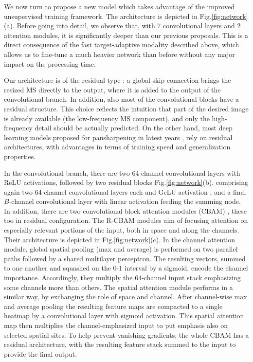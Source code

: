 \documentclass[journal]{IEEEtran}
\begin{document}
We now turn to propose a new model which takes advantage of the improved unsupervised training framework.
The architecture is depicted in Fig.\ref{fig:network}(a).
Before going into detail, we observe that, with 7 convolutional layers and 2 attention modules, it is significantly deeper than our previous proposals.
This is a direct consequence of the fast target-adaptive modality described above,
which allows us to fine-tune a much heavier network than before without any major impact on the processing time.

Our architecture is of the residual type \cite{He2016}:
a global skip connection brings the resized MS directly to the output,
where it is added to the output of the convolutional branch.
In addition, also most of the convolutional blocks have a residual structure.
This choice reflects the intuition that part of the desired image is already available (the low-frequency MS component),
and only the high-frequency detail should be actually predicted.
On the other hand, most deep learning models proposed for pansharpening in latest years \cite{Yang2017, Wei2017L, Yuan2018, Deng2020, Luo2020, Ciotola2022},
rely on residual architectures, with advantages in terms of training speed and generalization properties.

In the convolutional branch, there are two 64-channel convolutional layers with ReLU activations,
followed by two residual blocks Fig.\ref{fig:network}(b),
comprising again two 64-channel convolutional layers each and GeLU activation \cite{Hendrycks2016},
and a final $B$-channel convolutional layer with linear activation feeding the summing node.
In addition, there are two convolutional block attention modules (CBAM) \cite{Woo2018}, these too in residual configuration.
The R-CBAM modules aim of focusing attention on especially relevant portions of the input, both in space and along the channels.
Their architecture is depicted in Fig.\ref{fig:network}(c).
In the channel attention module,
global spatial pooling (max and average) is performed on two parallel paths followed by a shared multilayer perceptron.
The resulting vectors, summed to one another and squashed on the 0-1 interval by a sigmoid,
encode the channel importance.
Accordingly, they multiply the 64-channel input stack emphasizing some channels more than others.
The spatial attention module performs in a similar way, by exchanging the role of space and channel.
After channel-wise max and average pooling
the resulting feature maps are compacted to a single heatmap by a convolutional layer with sigmoid activation.
This spatial attention map then multiplies the channel-emphasized input to put emphasis also on selected spatial sites.
To help prevent vanishing gradients, the whole CBAM has a residual architecture,
with the resulting feature stack summed to the input to provide the final output.
\end{document}
